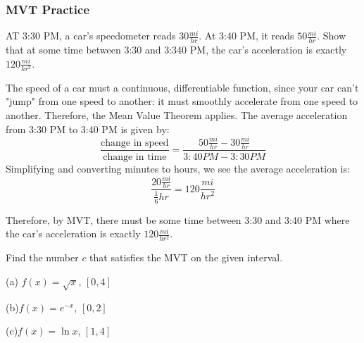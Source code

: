 \subsubsection{MVT Practice}
\begin{Exercise}
[label=MVT1]
AT 3:30 PM, a car's speedometer reads $30 \frac{mi}{hr}$. At 3:40 PM, it reads $50\frac{mi}{hr}$. Show that at some time between 3:30 and 3:340 PM, the car's acceleration is exactly $120 \frac{mi}{hr^2}$. 
\end{Exercise}
\begin{Answer}
[ref=MVT1]
The speed of a car must a continuous, differentiable function, since your car can't "jump" from one speed to another: it must smoothly accelerate from one speed to another. Therefore, the Mean Value Theorem applies. The average acceleration from 3:30 PM to 3:40 PM is given by:
$$\frac{\text{change in speed}}{\text{change in time}} = \frac{50 \frac{mi}{hr}-30\frac{mi}{hr}}{3:40PM-3:30PM}$$ 
Simplifying and converting minutes to hours, we see the average acceleration is:
$$\frac{20\frac{mi}{hr}}{\frac{1}{6}hr} = 120\frac{mi}{hr^2}$$

Therefore, by MVT, there must be some time between 3:30 and 3:40 PM where the car's acceleration is exactly $120 \frac{mi}{hr^2}$. 
\end{Answer}

\begin{Exercise}
[label=MVT2]
Find the number $c$ that satisfies the MVT on the given interval. 

(a) $f(x) = \sqrt{x}$, $[0, 4]$

(b)$f(x) = e^{-x}$, $[0,2]$

(c)$f(x) = \ln{x}$, $[1,4]$	
\end{Exercise}


